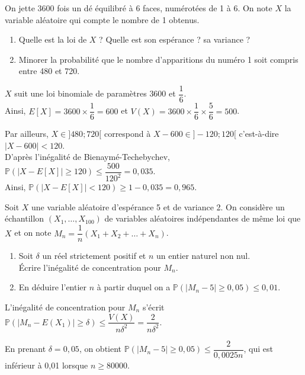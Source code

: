 \documentclass[11pt,fleqn, openany]{book} %
\begin{document}
\begin{exercise}On jette 3600 fois un dé équilibré à 6 faces,  numérotées de 1 à 6. On note $X$ la variable aléatoire qui compte le nombre de 1 obtenus.
\begin{enumerate}
\item Quelle est la loi de $X$ ? Quelle est son espérance ? sa variance ?
\item Minorer la probabilité que le nombre d'apparitions du numéro 1 soit compris entre 480 et 720.\end{enumerate}\end{exercise}

\begin{solution}$X$ suit une loi binomiale de paramètres $3600$ et $\dfrac{1}{6}$. \\Ainsi, $E[X]=3600 \times \dfrac{1}{6} = 600$ et $V(X)=3600 \times \dfrac{1}{6} \times \dfrac{5}{6}=500$.

Par ailleurs, $X \in ]480;720[$ correspond à $X-600 \in ]-120;120[$ c'est-à-dire $|X-600| < 120$. \\D'après l'inégalité de Bienaymé-Techebychev, 
$\mathbb{P}(|X-E[X]| \geqslant 120) \leqslant \dfrac{500}{120^2}=0,035$. \\Ainsi, $\mathbb{P}(|X-E[X]| < 120) \geqslant 1-0,035 = 0,965$.\end{solution}




\begin{exercise}Soit $X$ une variable aléatoire d'espérance 5 et de variance 2. On considère un échantillon $(X_1, \ldots, X_{100})$ de variables aléatoires indépendantes de même loi que $X$ et on note $M_n = \dfrac{1}{n} (X_1+X_2+\ldots + X_n)$.
\begin{enumerate}
\item Soit $\delta$ un réel strictement positif et $n$ un entier naturel non nul. \\ Écrire l'inégalité de concentration pour $M_n$.
\item En déduire l'entier $n$ à partir duquel on a $\mathbb{P}(|M_n-5|\geqslant 0,05 ) \leqslant 0,01$.
\end{enumerate}\end{exercise}

\begin{solution}L'inégalité de concentration pour $M_n$ s'écrit $\mathbb{P}(|M_n-E(X_1)|\geqslant \delta )\leqslant \dfrac{V(X)}{n\delta ^2}=\dfrac{2}{n\delta ^2}$.

En prenant $\delta = 0,05$, on obtient $\mathbb{P}(|M_n-5|\geqslant 0,05 ) \leqslant \dfrac{2}{0,0025n}$, qui est inférieur à 0,01 lorsque $n\geqslant 80000$.\end{solution}
\end{document}

